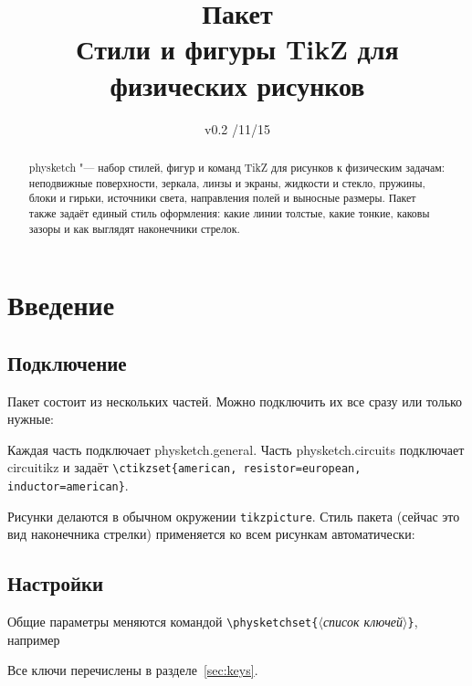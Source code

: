 \documentclass[a4paper,11pt]{article}
\title{Пакет \pkg{physketch}\\[2pt]
  \large Стили и фигуры TikZ для физических рисунков}
\author{}
\date{v0.2 \quad 2026/11/15}
\newcommand\pkg[1]{\textsf{#1}}
\newcommand\cs[1]{\texttt{\textbackslash#1}}
\newcommand\marg[1]{\texttt{\{}\meta{#1}\texttt{\}}}
\newcommand\meta[1]{\ensuremath{\langle}\textit{#1}\ensuremath{\rangle}}
\begin{document}
\maketitle

\begin{abstract}
\pkg{physketch} "--- набор стилей, фигур и команд TikZ для рисунков к
физическим задачам: неподвижные поверхности, зеркала, линзы и экраны,
жидкости и стекло, пружины, блоки и гирьки, источники света, направления
полей и выносные размеры. Пакет также задаёт единый стиль оформления:
какие линии толстые, какие тонкие, каковы зазоры и как выглядят наконечники
стрелок.
\end{abstract}

\tableofcontents

\section{Введение}

\subsection{Подключение}
Пакет состоит из нескольких частей. Можно подключить их все сразу или только
нужные:
\begin{code}
\usepackage{physketch}             %
\usepackage{physketch.general}     %
\usepackage{physketch.mechanics}   %
\usepackage{physketch.optics}      %
\usepackage{physketch.circuits}    %
\end{code}
Каждая часть подключает \pkg{physketch.general}. Часть
\pkg{physketch.circuits} подключает \pkg{circuitikz} и задаёт
\verb|\ctikzset{american, resistor=european, inductor=american}|.

Рисунки делаются в обычном окружении \texttt{tikzpicture}. Стиль пакета
(сейчас это вид наконечника стрелки) применяется ко всем рисункам
автоматически:
\begin{example}
\end{example}

\subsection{Настройки}
Общие параметры меняются командой \cs{physketchset}\marg{список ключей},
например
\begin{code}
\end{code}
Все ключи перечислены в разделе~\ref{sec:keys}.
\end{document}
